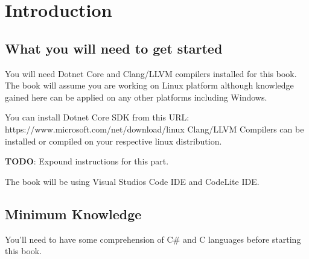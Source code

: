\chapter{Introduction}
\section{What you will need to get started}
You will need Dotnet Core and Clang/LLVM compilers installed for this book. The book will assume you are working on Linux platform although knowledge gained here can be applied on any other platforms including Windows.

You can install Dotnet Core SDK from this URL: https://www.microsoft.com/net/download/linux
Clang/LLVM Compilers can be installed or compiled on your respective linux distribution.

\textbf{TODO}: Expound instructions for this part.

The book will be using Visual Studios Code IDE and CodeLite IDE.

\section{Minimum Knowledge}
You'll need to have some comprehension of C\# and C languages before starting this book.
